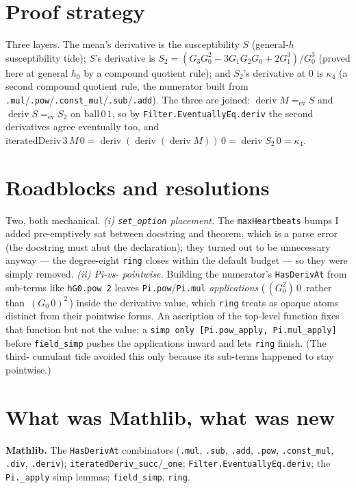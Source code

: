 \documentclass[11pt]{article}
\newcommand{\deriv}{\operatorname{deriv}}
\begin{document}
\section{Proof strategy}

Three layers. The mean's derivative is the susceptibility $S$ (general-$h$
susceptibility tide); $S$'s derivative is $S_2=(G_3G_0^2-3G_1G_2G_0+2G_1^3)/G_0^3$
(proved here at general $h_0$ by a compound quotient rule); and $S_2$'s
derivative at $0$ is $\kappa_4$ (a second compound quotient rule, the numerator
built from \texttt{.mul}/\texttt{.pow}/\texttt{.const\_mul}/\texttt{.sub}/\texttt{.add}).
The three are joined: $\deriv M =_{\text{ev}} S$ and $\deriv S =_{\text{ev}} S_2$
on $\mathrm{ball}\,0\,1$, so by \texttt{Filter.EventuallyEq.deriv} the second
derivatives agree eventually too, and
$\mathrm{iteratedDeriv}\,3\,M\,0 = \deriv(\deriv(\deriv M))\,0 = \deriv S_2\,0
= \kappa_4$.

\section{Roadblocks and resolutions}

Two, both mechanical. \emph{(i) \texttt{set\_option} placement.} The
\texttt{maxHeartbeats} bumps I added pre-emptively sat between docstring and
theorem, which is a parse error (the docstring must abut the declaration); they
turned out to be unnecessary anyway --- the degree-eight \texttt{ring} closes
within the default budget --- so they were simply removed. \emph{(ii) Pi-vs-%
pointwise.} Building the numerator's \texttt{HasDerivAt} from sub-terms like
\texttt{hG0.pow 2} leaves \texttt{Pi.pow}/\texttt{Pi.mul} \emph{applications}
($\,(G_0^2)\,0\,$ rather than $\,(G_0\,0)^2\,$) inside the derivative value, which
\texttt{ring} treats as opaque atoms distinct from their pointwise forms. An
ascription of the top-level function fixes that function but not the value;
a \texttt{simp only [Pi.pow\_apply, Pi.mul\_apply]} before \texttt{field\_simp}
pushes the applications inward and lets \texttt{ring} finish. (The third-%
cumulant tide avoided this only because its sub-terms happened to stay
pointwise.)

\section{What was Mathlib, what was new}

\textbf{Mathlib.} The \texttt{HasDerivAt} combinators (\texttt{.mul},
\texttt{.sub}, \texttt{.add}, \texttt{.pow}, \texttt{.const\_mul}, \texttt{.div},
\texttt{.deriv}); \texttt{iteratedDeriv\_succ}/\texttt{\_one};
\texttt{Filter.EventuallyEq.deriv}; the \texttt{Pi.\_apply} simp lemmas;
\texttt{field\_simp}, \texttt{ring}.
\end{document}
